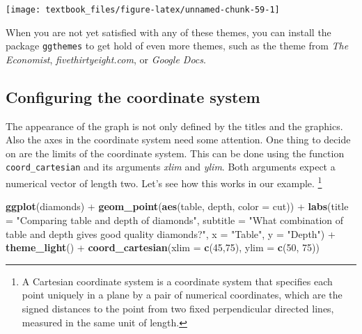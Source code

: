 \documentclass[]{tufte-book}
\newenvironment{Shaded}{}{}
\newcommand{\DataTypeTok}[1]{\textcolor[rgb]{0.56,0.13,0.00}{#1}}
\newcommand{\DecValTok}[1]{\textcolor[rgb]{0.25,0.63,0.44}{#1}}
\newcommand{\KeywordTok}[1]{\textcolor[rgb]{0.00,0.44,0.13}{\textbf{#1}}}
\newcommand{\NormalTok}[1]{#1}
\newcommand{\OperatorTok}[1]{\textcolor[rgb]{0.40,0.40,0.40}{#1}}
\newcommand{\StringTok}[1]{\textcolor[rgb]{0.25,0.44,0.63}{#1}}
\begin{document}
\texttt{[image: textbook\_files/figure-latex/unnamed-chunk-59-1]}

When you are not yet satisfied with any of these themes, you can install the package \texttt{ggthemes} to get hold of even more themes, such as the theme from \emph{The Economist}, \emph{fivethirtyeight.com}, or \emph{Google Docs}.

\hypertarget{configuring-the-coordinate-system}{%
\subsection{Configuring the coordinate system}\label{configuring-the-coordinate-system}}

The appearance of the graph is not only defined by the titles and the graphics. Also the axes in the coordinate system need some attention. One thing to decide on are the limits of the coordinate system. This can be done using the function \texttt{coord\_cartesian} and its arguments \emph{xlim} and \emph{ylim}. Both arguments expect a numerical vector of length two. Let's see how this works in our example. \footnote{A Cartesian coordinate system is a coordinate system that specifies each point uniquely in a plane by a pair of numerical coordinates, which are the signed distances to the point from two fixed perpendicular directed lines, measured in the same unit of length.}

\begin{Shaded}
\begin{Highlighting}[]
\KeywordTok{ggplot}\NormalTok{(diamonds) }\OperatorTok{+}
\StringTok{    }\KeywordTok{geom_point}\NormalTok{(}\KeywordTok{aes}\NormalTok{(table, depth, }\DataTypeTok{color =}\NormalTok{ cut)) }\OperatorTok{+}\StringTok{ }
\StringTok{    }\KeywordTok{labs}\NormalTok{(}\DataTypeTok{title =} \StringTok{"Comparing table and depth of diamonds"}\NormalTok{,}
         \DataTypeTok{subtitle =} \StringTok{"What combination of table and depth gives good quality diamonds?"}\NormalTok{,}
         \DataTypeTok{x =} \StringTok{"Table"}\NormalTok{,}
         \DataTypeTok{y =} \StringTok{"Depth"}\NormalTok{) }\OperatorTok{+}
\StringTok{    }\KeywordTok{theme_light}\NormalTok{() }\OperatorTok{+}
\StringTok{    }\KeywordTok{coord_cartesian}\NormalTok{(}\DataTypeTok{xlim =} \KeywordTok{c}\NormalTok{(}\DecValTok{45}\NormalTok{,}\DecValTok{75}\NormalTok{), }\DataTypeTok{ylim =} \KeywordTok{c}\NormalTok{(}\DecValTok{50}\NormalTok{, }\DecValTok{75}\NormalTok{))}
\end{Highlighting}
\end{Shaded}
\end{document}
